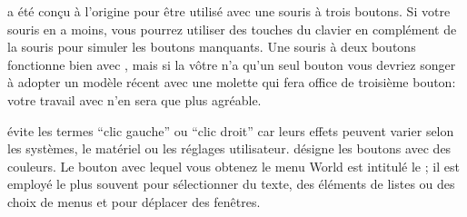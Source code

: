 \documentclass[a4paper,10pt,twoside]{book}
\begin{document}
\sq a été conçu à l'origine pour être utilisé avec une souris à trois
boutons. Si votre souris en a moins, vous pourrez utiliser des touches
du clavier en complément de la souris pour simuler les boutons
manquants. Une souris à deux boutons fonctionne bien avec \sq, mais si
la v\^otre n'a qu'un seul bouton vous devriez songer à adopter un
modèle récent avec une molette qui fera office de troisième bouton: votre travail avec \sq n'en sera que plus agréable.


\sq évite les termes ``clic gauche'' ou ``clic droit'' car leurs
effets peuvent varier selon les systèmes, le mat\'eriel ou les
réglages utilisateur. \sq désigne les boutons avec des couleurs. Le
bouton avec lequel vous obtenez le menu World est intitulé le
; il est employé le plus souvent pour
s\'electionner du texte, des \'el\'ements de listes ou des choix de
menus et pour déplacer des fenêtres.
\end{document}
